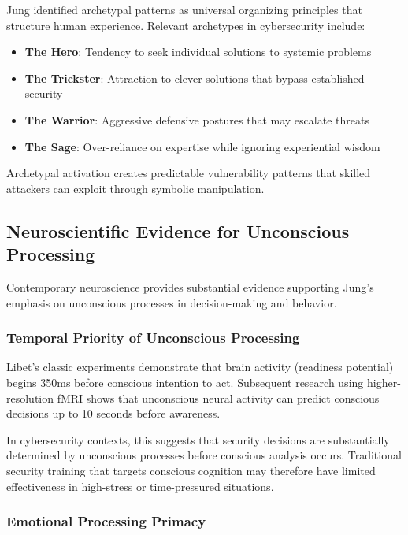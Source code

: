 \documentclass[11pt,a4paper]{article}
\begin{document}
Jung identified archetypal patterns as universal organizing principles that structure human experience. Relevant archetypes in cybersecurity include:

\begin{itemize}
\item \textbf{The Hero}: Tendency to seek individual solutions to systemic problems
\item \textbf{The Trickster}: Attraction to clever solutions that bypass established security
\item \textbf{The Warrior}: Aggressive defensive postures that may escalate threats
\item \textbf{The Sage}: Over-reliance on expertise while ignoring experiential wisdom
\end{itemize}

Archetypal activation creates predictable vulnerability patterns that skilled attackers can exploit through symbolic manipulation\cite{hillman1975}.

\subsection{Neuroscientific Evidence for Unconscious Processing}

Contemporary neuroscience provides substantial evidence supporting Jung's emphasis on unconscious processes in decision-making and behavior.

\subsubsection{Temporal Priority of Unconscious Processing}

Libet's classic experiments demonstrate that brain activity (readiness potential) begins 350ms before conscious intention to act\cite{libet1983}. Subsequent research using higher-resolution fMRI shows that unconscious neural activity can predict conscious decisions up to 10 seconds before awareness\cite{soon2008}.

In cybersecurity contexts, this suggests that security decisions are substantially determined by unconscious processes before conscious analysis occurs. Traditional security training that targets conscious cognition may therefore have limited effectiveness in high-stress or time-pressured situations.

\subsubsection{Emotional Processing Primacy}
\end{document}
